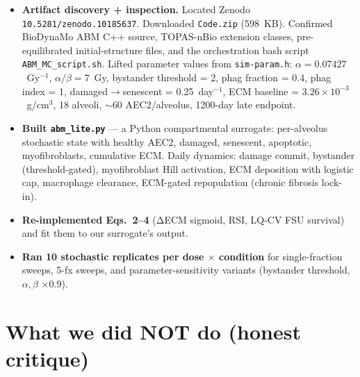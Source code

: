 \documentclass[11pt]{article}
\begin{document}
\begin{itemize}
  \item \textbf{Artifact discovery + inspection.} Located Zenodo
        \texttt{10.5281/zenodo.10185637}. Downloaded \texttt{Code.zip}
        (598~KB). Confirmed BioDynaMo ABM C++ source, TOPAS-nBio
        extension classes, pre-equilibrated initial-structure files, and
        the orchestration bash script \texttt{ABM\_MC\_script.sh}. Lifted
        parameter values from \texttt{sim-param.h}: $\alpha=0.07427$~Gy$^{-1}$,
        $\alpha/\beta=7$~Gy, bystander threshold = 2, phag fraction = 0.4,
        phag index = 1, damaged$\rightarrow$senescent = 0.25~day$^{-1}$,
        ECM baseline = $3.26\times 10^{-3}$~g/cm$^3$, 18 alveoli,
        $\sim 60$ AEC2/alveolus, 1200-day late endpoint.
  \item \textbf{Built \texttt{abm\_lite.py}} --- a Python compartmental
        surrogate: per-alveolus stochastic state with healthy AEC2,
        damaged, senescent, apoptotic, myofibroblasts, cumulative ECM.
        Daily dynamics: damage commit, bystander (threshold-gated),
        myofibroblast Hill activation, ECM deposition with logistic cap,
        macrophage clearance, ECM-gated repopulation (chronic
        fibrosis lock-in).
  \item \textbf{Re-implemented Eqs.\ 2--4} (ΔECM sigmoid, RSI, LQ-CV FSU
        survival) and fit them to our surrogate's output.
  \item \textbf{Ran 10 stochastic replicates per dose $\times$
        condition} for single-fraction sweeps, 5-fx sweeps, and
        parameter-sensitivity variants (bystander threshold, $\alpha,\beta$
        $\times 0.9$).
\end{itemize}

\section{What we did NOT do (honest critique)}
\end{document}
